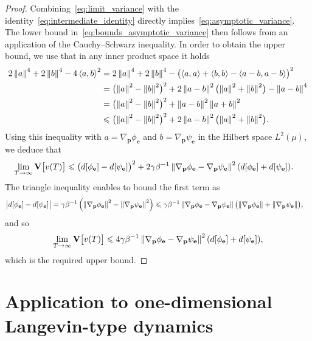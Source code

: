 \documentclass[11pt,a4paper]{article}
\newcommand{\var}[0]{\mathbf{V}}
\newcommand{\grad}{\nabla}
\newcommand{\vect}[1]{\boldsymbol{\mathbf #1}}
\theoremstyle{plain}
\numberwithin{equation}{section}
\renewcommand{\leq}{\leqslant}
\begin{document}
\begin{proof}
    Combining~\eqref{eq:limit_variance} with the identity~\eqref{eq:intermediate_identity} directly implies~\eqref{eq:asymptotic_variance}.
    The lower bound in~\eqref{eq:bounds_asymptotic_variance} then follows from an application of the Cauchy--Schwarz inequality.
    In order to obtain the upper bound,
    we use that in any inner product space it holds
    \begin{align*}
        2 \norm{a}^4 + 2 \norm{b}^4 - 4\ip{a}{b}^2
        &= 2 \norm{a}^4 + 2 \norm{b}^4 - \bigl(\ip{a}{a} + \ip{b}{b} - \ip{a-b}{a-b} \bigr)^2 \\
        &= \bigl(\norm{a}^2 - \norm{b}^2 \bigr)^2 + 2 \norm{a-b}^2 \bigl(\norm{a}^2 + \norm{b}^2 \bigr) - \norm{a-b}^4 \\
        &= \bigl(\norm{a}^2 - \norm{b}^2 \bigr)^2 + \norm{a-b}^2 \norm{a + b}^2 \\
        &\leq \bigl(\norm{a}^2 - \norm{b}^2 \bigr)^2 + 2 \norm{a-b}^2 \bigl(\norm{a}^2 + \norm{b}^2\bigr).
    \end{align*}
    Using this inequality with $a = \grad_{\vect p} \phi_{\vect e}$ and $b = \grad_{\vect p} \psi_{\vect e}$ in the Hilbert space $L^2(\mu)$,
    we deduce that
    \begin{align*}
        \lim_{T \to \infty} \var \bigl[v(T)\bigr]
        &\leq \bigl(d[\phi_{\vect e}] - d[\psi_{\vect e}]\bigr)^2 +
        2\gamma \beta^{-1} \norm{\grad_{\vect p} \phi_{\vect e} - \grad_{\vect p}  \psi_{\vect e}}^2 (d[\phi_{\vect e}] + d[\psi_{\vect e}]).
    \end{align*}
    The triangle inequality enables to bound the first term as
    \begin{align*}
        \bigl\lvert d[\phi_{\vect e}] - d[\psi_{\vect e}] \bigr\rvert
        &= \gamma \beta^{-1} \left( \norm{\grad_{\vect p} \phi_{\vect e}}^2 - \norm{\grad_{\vect p} \psi_{\vect e}}^2 \right)
        \leq \gamma \beta^{-1} \norm{\grad_{\vect p} \phi_{\vect e} - \grad_{\vect p} \psi_{\vect e}} \bigl( \norm{\grad_{\vect p} \phi_{\vect e}} + \norm{\grad_{\vect p} \psi_{\vect e}} \bigr),
    \end{align*}
    and so
    \[
        \lim_{T \to \infty} \var \bigl[v(T)\bigr]
        \leq  4\gamma \beta^{-1}  \norm{\grad_{\vect p} \phi_{\vect e} - \grad_{\vect p}  \psi_{\vect e}}^2 (d[\phi_{\vect e}] + d[\psi_{\vect e}]),
    \]
    which is the required upper bound.
\end{proof}

\section{Application to one-dimensional Langevin-type dynamics}%
\label{sec:application_to_one_dimensional_langevin_type_dynamics}
\end{document}
